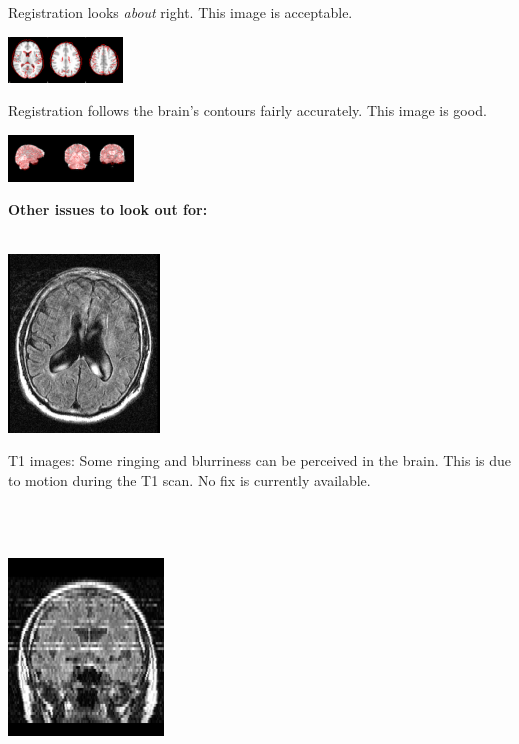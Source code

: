 \documentclass[12pt]{article}
\begin{document}
\noindent\begin{minipage}{0.45\textwidth}
	Registration looks \emph{about} right. This image is acceptable. 
\end{minipage}%
\hfill%
\begin{minipage}{0.45\textwidth}
	\includegraphics[scale=1.7]{reg_good1.png}
\end{minipage}\newline\newline
\noindent\begin{minipage}{0.45\textwidth}
	Registration follows the brain's contours fairly accurately. This image is good. 
\end{minipage}%
\hfill%
\begin{minipage}{0.45\textwidth}
	\includegraphics[scale=1.55]{reg_good2.png}
\end{minipage}
\newpage
\noindent\textbf{Other issues to look out for:}\\\\
\noindent\begin{minipage}{0.3\textwidth}
	\includegraphics[scale=0.75]{T1_bad1.png}
\end{minipage}%
\hfill%
\begin{minipage}{0.6\textwidth}
	T1 images: Some ringing and blurriness can be perceived in the brain. This is due to motion during the T1 scan. No fix is currently available. 
\end{minipage}\\\\
\noindent\begin{minipage}{0.3\textwidth}
	\includegraphics[scale=0.735]{T1_bad2.png}
\end{minipage}%
\end{document}
